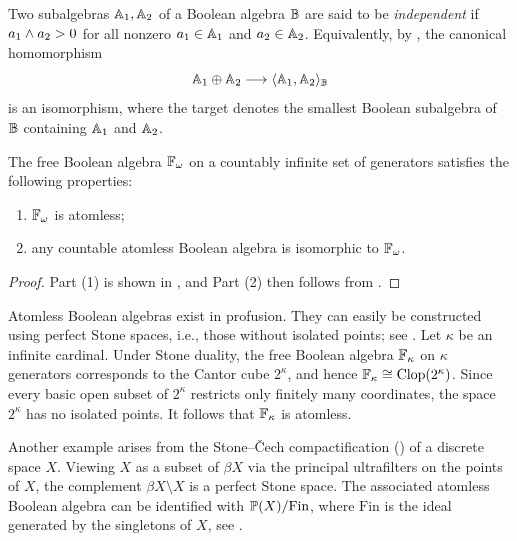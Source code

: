\documentclass{amsart}
\begin{document}
    \begin{Def}
        Two subalgebras $\mathbb{A}_1,\mathbb{A}_2$ of a Boolean algebra $\mathbb{B}$ are said to be \emph{independent} if $a_1 \land a_2 >0$ for all nonzero $a_1 \in \mathbb{A}_1$ and $a_2 \in \mathbb{A}_2$. Equivalently, by \cite[Corollary 44.1]{GivantHalmos2009Introduction}, the canonical homomorphism
        \[
            \mathbb{A}_1\oplus\mathbb{A}_2  \longrightarrow \langle\mathbb{A}_1,\mathbb{A}_2\rangle_{\mathbb{B}}
        \]
        is an isomorphism, where the target denotes the smallest Boolean subalgebra of $\mathbb{B}$ containing $\mathbb{A}_1$ and $\mathbb{A}_2$.
    \end{Def}
    
    \begin{Thm}\label{thm:omegafree}
        The free Boolean algebra $\mathbb{F}_{\omega}$ on a countably infinite set of generators satisfies the following properties:
        \begin{enumerate}
            \item $\mathbb{F}_{\omega}$ is atomless;
            \item any countable atomless Boolean algebra is isomorphic to $\mathbb{F}_{\omega}$. 
        \end{enumerate}
    \end{Thm}
    \begin{proof}
       Part (1) is shown in \cite[Corollary 28.2]{GivantHalmos2009Introduction}, and Part (2) then follows from \cite[Theorem 10.2]{GivantHalmos2009Introduction}. 
    \end{proof}
    
\begin{Exa}\label{exa:atomlessBA}
    Atomless Boolean algebras exist in profusion. They can easily be constructed using perfect Stone spaces, i.e., those without isolated points; see . Let $\kappa$ be an infinite cardinal. Under Stone duality, the free Boolean algebra $\mathbb{F}_\kappa$ on $\kappa$ generators corresponds to the Cantor cube $2^\kappa$, and hence $\mathbb{F}_\kappa \cong \operatorname{Clop}(2^\kappa)$. Since every basic open subset of $2^\kappa$ restricts only finitely many coordinates, the space $2^\kappa$ has no isolated points. It follows that $\mathbb{F}_\kappa$ is atomless.

    Another example arises from the Stone--\v{C}ech compactification () of a discrete space $X$. Viewing $X$ as a subset of $\beta X$ via the principal ultrafilters on the points of $X$, the complement $\beta X \setminus X$ is a perfect Stone space. The associated atomless Boolean algebra can be identified with $\mathbb{P}(X)/\mathrm{Fin}$, where $\mathrm{Fin}$ is the ideal generated by the singletons of $X$, see \cite[Example~5.28(b)]{Koppelberg1989Handbook}.
\end{Exa}
    
\end{document}
